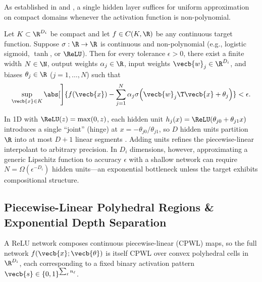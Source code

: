 \documentclass[../../../../master.tex]{subfiles}
\begin{document}
As established in  and , a single hidden layer suffices for uniform approximation on compact domains whenever the activation function is non-polynomial.

\begin{coremath}
\label{thm:mlpkan:uat}
Let $K \subset \R^{D_i}$ be compact and let $f \in C(K, \R)$ be any continuous target function. Suppose $\sigma : \R \to \R$ is continuous and non-polynomial (e.g., logistic sigmoid, $\tanh$, or $\ReLU$). Then for every tolerance $\epsilon > 0$, there exist a finite width $N \in \N$, output weights $\alpha_j \in \R$, input weights $\vecb{w}_j \in \R^{D_i}$, and biases $\theta_j \in \R$ ($j = 1, \dots, N$) such that
\begin{equation}
  \label{eq:mlpkan:uat}
  \sup_{\vecb{x} \in K} \abs[\Bigg]{f(\vecb{x}) - \sum_{j=1}^N \alpha_j \sigma\!\left(\vecb{w}_j\T \vecb{x} + \theta_j\right)} < \epsilon.
\end{equation}
\end{coremath}

\begin{intuition}
In 1D with $\ReLU(z) = \max(0, z)$, each hidden unit $h_j(x) = \ReLU(\theta_{j0} + \theta_{j1}x)$ introduces a single ``joint'' (hinge) at $x = -\theta_{j0}/\theta_{j1}$, so $D$ hidden units partition $\R$ into at most $D + 1$ linear segments . Adding units refines the piecewise-linear interpolant to arbitrary precision. In $D_i$ dimensions, however, approximating a generic Lipschitz function to accuracy $\epsilon$ with a shallow network can require $N = \Omega(\epsilon^{-D_i})$ hidden units---an exponential bottleneck unless the target exhibits compositional structure.
\end{intuition}

\subsection{Piecewise-Linear Polyhedral Regions \& Exponential Depth Separation}

A ReLU network composes continuous piecewise-linear (CPWL) maps, so the full network $f(\vecb{x}; \vecb{\theta})$ is itself CPWL over convex polyhedral cells in $\R^{D_i}$, each corresponding to a fixed binary activation pattern $\vecb{s} \in \{0,1\}^{\sum_\ell n_\ell}$.
\end{document}
